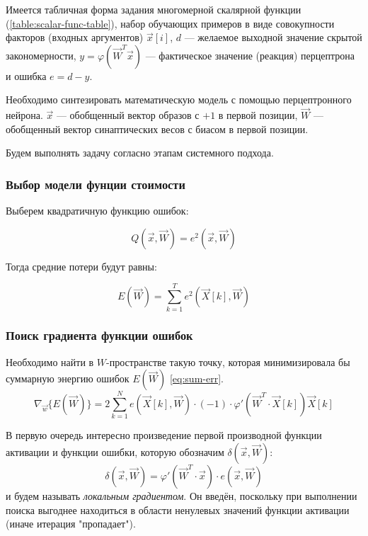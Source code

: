 \documentclass{article}
\numberwithin{equation}{subsection}
\begin{document}
Имеется табличная форма задания многомерной скалярной функции (\ref{table:scalar-func-table}), 
набор обучающих примеров в виде совокупности факторов (входных аргументов) $\vec{x}[i]$, $d$ ---
желаемое выходной значение скрытой закономерности, $y = \varphi (\vec{W}^T \vec{x})$ ---
фактическое значение (реакция) перцептрона и ошибка $e = d - y$.

Необходимо синтезировать математическую модель с помощью перцептронного нейрона. 
$\vec{x}$ --- обобщенный вектор образов с $+1$ в первой позиции, $\vec{W}$ ---
обобщенный вектор синаптических весов с биасом в первой позиции.

Будем выполнять задачу согласно этапам системного подхода.



\subsubsection{Выбор модели фунции стоимости}

Выберем квадратичную функцию ошибок:

\begin{equation}
    Q(\vec{x}, \vec{W}) = e^2(\vec{x}, \vec{W})
\end{equation}

Тогда средние потери будут равны:
    
\begin{equation}
    E(\vec{W}) = \sum_{k=1}^{T} e^2 (\vec{X}[k], \vec{W})
    \label{eq:sum-err}
\end{equation}



\subsubsection{Поиск градиента функции ошибок}

Необходимо найти в $W$-пространстве такую точку, которая минимизировала бы суммарную 
энергию ошибок $E(\vec{W})$ \ref{eq:sum-err}.
\begin{equation}
    \nabla_{\vec{w}} \{ E(\vec{W}) \} = 2 \sum_{k=1}^{N} e (\vec{X}[k], \vec{W}) \cdot (-1)
    \cdot \varphi ' (\vec{W}^T \cdot \vec{X}[k]) \vec{X}[k]
\end{equation}

В первую очередь интересно произведение первой производной функции активации и функции ошибки, 
которую обозначим $\delta(\vec{x}, \vec{W})$:
\begin{equation}
    \delta(\vec{x}, \vec{W}) = \varphi ' (\vec{W}^{T} \cdot \vec{x}) \cdot e(\vec{x}, \vec{W})
    \label{eq:local_grad}
\end{equation}
\noindent
и будем называть \textit{локальным градиентом}. 
Он введён, поскольку при выполнении поиска выгоднее находиться в области ненулевых значений
функции активации (иначе итерация "пропадает").
\end{document}
